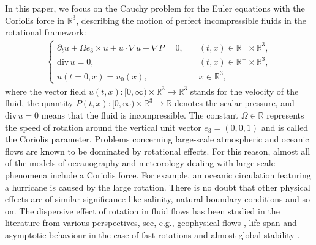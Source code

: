 \documentclass[12pt]{article}
\newcommand{\pa}{\partial}
\newcommand{\R}{\mathbb{R}}
\begin{document}
In this paper, we focus on the Cauchy problem for the Euler equations with the Coriolis force in $\R^3$,
describing the motion of perfect incompressible fluids in the rotational framework:
\begin{align}\label{CE}
\begin{cases}
\pa_t u+\Omega e_3\times u+u\cdot \nabla u+\nabla P=0, &\quad (t,x)\in \R^+\times\R^3,\\
\mathrm{div\,} u=0,&\quad (t,x)\in \R^+\times\R^3,\\
u(t=0,x)=u_0(x), &\quad x\in \R^3,
\end{cases}
\end{align}
where the vector field $u(t,x):[0,\infty)\times {\mathbb R}^3\to {\mathbb R}^3$ stands for the velocity of the fluid, the quantity $P(t,x):[0,\infty)\times {\mathbb R}^3\to {\mathbb R}$ denotes the scalar pressure, and $\mathrm{div\,} u=0$ means that the fluid is incompressible.
The constant $\Omega\in\R$ represents the speed of rotation around
the vertical unit vector $e_3 = (0, 0, 1)$ and is called the Coriolis parameter. Problems concerning large-scale atmospheric and oceanic flows are known to be dominated by rotational effects. For this reason, almost all of the models of oceanography and meteorology dealing with large-scale phenomena include a Coriolis force. For example, an oceanic circulation featuring a hurricane is caused by the large rotation. There is no doubt that other physical effects are of similar significance like salinity, natural boundary conditions and so on.  The dispersive effect of rotation in fluid flows has been studied in the literature from various perspectives, see, e.g., geophysical flows \cite{IR,JM,JP}, life span and asymptotic behaviour in the case of fast rotations \cite{ch1,ch2,d,KY} and almost global stability \cite{YGUO}.
\end{document}
